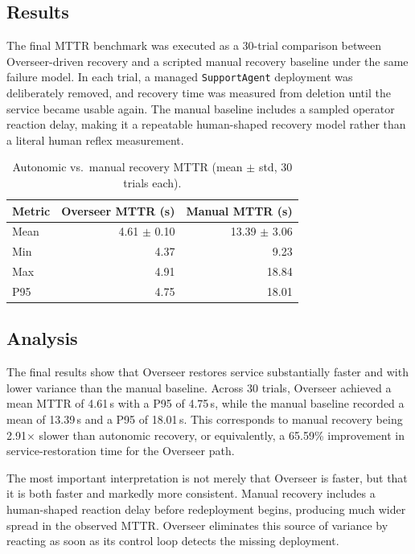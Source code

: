 \documentclass[12pt, a4paper]{report}
\begin{document}
\subsection{Results}
\label{ssec:exp3_results}

The final MTTR benchmark was executed as a 30-trial comparison between Overseer-driven
recovery and a scripted manual recovery baseline under the same failure model. In each
trial, a managed \texttt{SupportAgent} deployment was deliberately removed, and
recovery time was measured from deletion until the service became usable again. The
manual baseline includes a sampled operator reaction delay, making it a repeatable
human-shaped recovery model rather than a literal human reflex measurement.

\begin{table}[H]
  \centering
  \caption{Autonomic vs.\ manual recovery MTTR (mean $\pm$ std, 30 trials each).}
  \label{tab:mttr_results}
  \begin{tabular}{lrr}
    \toprule
    \textbf{Metric} &
    \textbf{Overseer MTTR (s)} &
    \textbf{Manual MTTR (s)} \\
    \midrule
    Mean  & 4.61 $\pm$ 0.10 & 13.39 $\pm$ 3.06 \\
    Min   & 4.37 & 9.23 \\
    Max   & 4.91 & 18.84 \\
    P95   & 4.75 & 18.01 \\
    \bottomrule
  \end{tabular}
\end{table}

\subsection{Analysis}
\label{ssec:exp3_analysis}

The final results show that Overseer restores service substantially faster and with
lower variance than the manual baseline. Across 30 trials, Overseer achieved a mean
MTTR of 4.61\,s with a P95 of 4.75\,s, while the manual baseline recorded a mean of
13.39\,s and a P95 of 18.01\,s. This corresponds to manual recovery being
2.91$\times$ slower than autonomic recovery, or equivalently, a 65.59\% improvement in
service-restoration time for the Overseer path.

The most important interpretation is not merely that Overseer is faster, but that it
is both faster and markedly more consistent. Manual recovery includes a human-shaped
reaction delay before redeployment begins, producing much wider spread in the observed
MTTR. Overseer eliminates this source of variance by reacting as soon as its control
loop detects the missing deployment.
\end{document}
